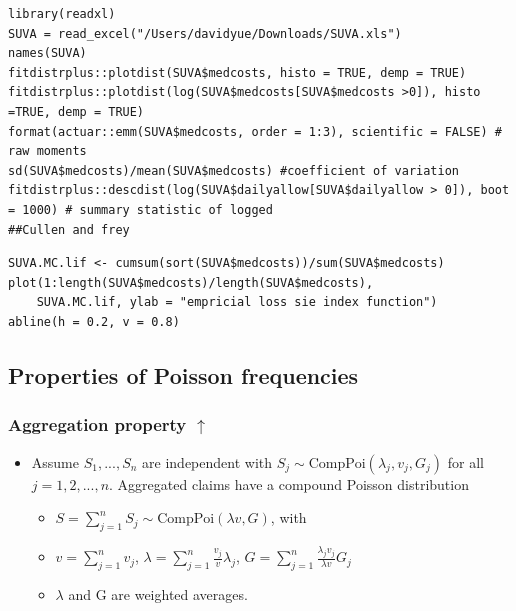\documentclass{article}
\begin{document}
\begin{lstlisting}
library(readxl)
SUVA = read_excel("/Users/davidyue/Downloads/SUVA.xls")
names(SUVA)
fitdistrplus::plotdist(SUVA$medcosts, histo = TRUE, demp = TRUE)
fitdistrplus::plotdist(log(SUVA$medcosts[SUVA$medcosts >0]), histo =TRUE, demp = TRUE)
format(actuar::emm(SUVA$medcosts, order = 1:3), scientific = FALSE) # raw moments
sd(SUVA$medcosts)/mean(SUVA$medcosts) #coefficient of variation
fitdistrplus::descdist(log(SUVA$dailyallow[SUVA$dailyallow > 0]), boot = 1000) # summary statistic of logged 
##Cullen and frey
\end{lstlisting}


\begin{lstlisting}
SUVA.MC.lif <- cumsum(sort(SUVA$medcosts))/sum(SUVA$medcosts)
plot(1:length(SUVA$medcosts)/length(SUVA$medcosts),
    SUVA.MC.lif, ylab = "empricial loss sie index function")
abline(h = 0.2, v = 0.8)
\end{lstlisting}

\subsection{Properties of Poisson frequencies}
\subsubsection{Aggregation property $\uparrow$}
\begin{itemize}
    \item Assume $S_1, ..., S_n$ are independent with $S_j \sim \text{CompPoi}(\lambda_j,v_j,G_j)$ for all $j = 1,2,...,n$. Aggregated claims have a compound Poisson distribution
    \begin{itemize}
        \item $S = \sum_{j=1}^n S_j \sim \text{CompPoi}(\lambda v,G)$, with
        \item $v = \sum_{j=1}^n v_j$, \hspace{1cm} $\lambda = \sum_{j=1}^n \frac{v_j}{v}\lambda_j$, \hspace{1cm} $G = \sum_{j=1}^n \frac{\lambda_j v_j}{\lambda v}G_j$
        \item $\lambda$ and G are weighted averages.
    \end{itemize}
\end{itemize}
\end{document}

